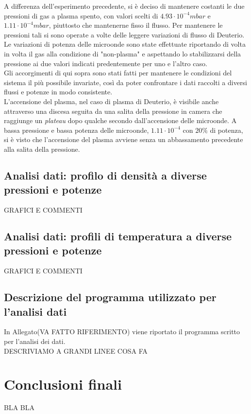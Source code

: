 A differenza dell'esperimento precedente, si è deciso di mantenere costanti le due pressioni di gas a plasma spento, con valori scelti di $4.93\cdot10^{-4}mbar$ e $1.11\cdot10^{-4}mbar$,
piuttosto che mantenerne fisso il flusso. 
Per mantenere le pressioni tali si sono operate a volte delle leggere variazioni di flusso di Deuterio.\\
Le variazioni di potenza delle microonde sono state effettuate riportando di volta in volta il gas alla condizione di "non-plasma" e aspettando lo stabilizzarsi della pressione ai due valori
indicati predentemente per uno e l'altro caso.\\
Gli accorgimenti di qui sopra sono stati fatti per mantenere le condizioni del sistema il più possibile invariate, così da poter confrontare i dati raccolti a diversi flussi e potenze in modo consistente.\\
L'accensione del plasma, nel caso di plasma di Deuterio, è visibile anche attraverso una discesa seguita da una salita della pressione in camera che raggiunge un \textit{plateau} dopo qualche secondo dall'accensione delle microonde.
A bassa pressione e bassa potenza delle microonde, $1.11\cdot10^{-4}$ con $20\%$ di potenza, si è visto che l'accensione del plasma avviene senza un abbassamento precedente alla salita della pressione.

\subsection{Analisi dati: profilo di densità a diverse pressioni e potenze}

GRAFICI E COMMENTI
\subsection{Analisi dati: profili di temperatura a diverse pressioni e potenze}

GRAFICI E COMMENTI

\subsection{Descrizione del programma utilizzato per l'analisi dati}
In Allegato(VA FATTO RIFERIMENTO) viene riportato il programma scritto per l'analisi dei dati.\\
DESCRIVIAMO A GRANDI LINEE COSA FA


\section{Conclusioni finali}
BLA BLA


